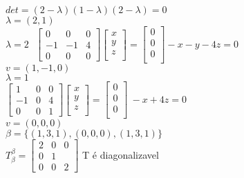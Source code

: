 \documentclass[a4paper,12pt]{report}
\begin{document}
$det=(2-\lambda)(1-\lambda)(2-\lambda)=0 $\\

$\lambda = (2,1)$\\


$\lambda = 2 \ \ \ \left [\begin{array}{rrr}
 0&0&0\\
-1&-1&4\\
0&0&0
\end{array}\right]  
\left[\begin{array}{rrr}
x\\
y\\
z\\
\end{array}\right] =  \left[\begin{array}{rrr}
0\\
0\\
0\\
\end{array}\right]
-x-y-4z = 0$\\

$v=(1,-1,0)$\\

$\lambda = 1 $\\

$\left [\begin{array}{rrr}
 1&0&0\\
-1&0&4\\
0&0&1
\end{array}\right]  \left[\begin{array}{rrr}
x\\
y\\
z\\
\end{array}\right] = \left[\begin{array}{rrr}
0\\
0\\
0\\
\end{array}\right] \ -x+4z = 0 $\\

$v= (0,0,0) $\\

$\beta = \lbrace (1,3,1),(0,0,0),(1,3,1) \rbrace $\\

$ T_\beta^\beta = \left [\begin{array}{rrr}
 2&0&0\\
0&1&\\
0&0&2
\end{array}\right]$ T \'e diagonalizavel \\
\linebreak  \\
\end{document}
